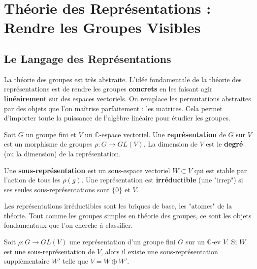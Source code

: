 \chapter{Théorie des Représentations : Rendre les Groupes Visibles}

\section{Le Langage des Représentations}

\begin{objectif}
    La théorie des groupes est très abstraite. L'idée fondamentale de la théorie des représentations est de rendre les groupes \textbf{concrets} en les faisant agir \textbf{linéairement} sur des espaces vectoriels. On remplace les permutations abstraites par des objets que l'on maîtrise parfaitement : les matrices. Cela permet d'importer toute la puissance de l'algèbre linéaire pour étudier les groupes.
\end{objectif}

\begin{definition}[Représentation]
    Soit $G$ un groupe fini et $V$ un $\mathbb{C}$-espace vectoriel. Une \textbf{représentation} de $G$ sur $V$ est un morphisme de groupes $\rho: G \to GL(V)$. La dimension de $V$ est le \textbf{degré} (ou la dimension) de la représentation.
\end{definition}

\begin{definition}
    Une \textbf{sous-représentation} est un sous-espace vectoriel $W \subset V$ qui est stable par l'action de tous les $\rho(g)$.
    Une représentation est \textbf{irréductible} (une "irrep") si ses seules sous-représentations sont $\{0\}$ et $V$.
\end{definition}

\begin{remark}
    Les représentations irréductibles sont les briques de base, les "atomes" de la théorie. Tout comme les groupes simples en théorie des groupes, ce sont les objets fondamentaux que l'on cherche à classifier.
\end{remark}

\begin{theorem}
    Soit $\rho: G \to GL(V)$ une représentation d'un groupe fini $G$ sur un $\mathbb{C}$-ev $V$. Si $W$ est une sous-représentation de $V$, alors il existe une sous-représentation supplémentaire $W'$ telle que $V = W \oplus W'$.
\end{theorem}

